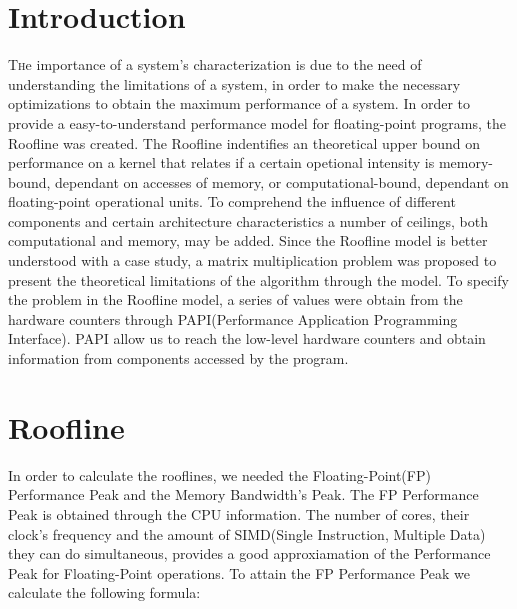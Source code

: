 \documentclass[twoside]{article}
\begin{document}
\begin{multicols}{2} %

\section{Introduction}

\lettrine[nindent=0em,lines=3]{T}he importance of a system's characterization is due to the need of understanding the limitations of a system, in order to make the necessary optimizations to obtain the maximum performance of a system. In order to provide a easy-to-understand performance model for floating-point programs, the Roofline was created. The Roofline indentifies an theoretical upper bound on performance on a kernel that relates if a certain opetional intensity is memory-bound, dependant on accesses of memory, or computational-bound, dependant on floating-point operational units. To comprehend the influence of different components and certain architecture characteristics a number of ceilings, both computational and memory, may be added. Since the Roofline model is better understood with a case study, a matrix multiplication problem was proposed to present the theoretical limitations of the algorithm through the model. To specify the problem in the Roofline model, a series of values were obtain from the hardware counters through PAPI(Performance Application Programming Interface). PAPI allow us to reach the low-level hardware counters and obtain information from components accessed by the program.


\section{Roofline}

In order to calculate the rooflines, we needed the Floating-Point(FP) Performance Peak and the Memory Bandwidth's Peak. The FP Performance Peak is obtained through the CPU information. The number of cores, their clock's frequency and the amount of SIMD(Single Instruction, Multiple Data) they can do simultaneous, provides a good approxiamation of the Performance Peak for Floating-Point operations.
To attain the FP Performance Peak we calculate the following formula:


\end{multicols}
\end{document}
